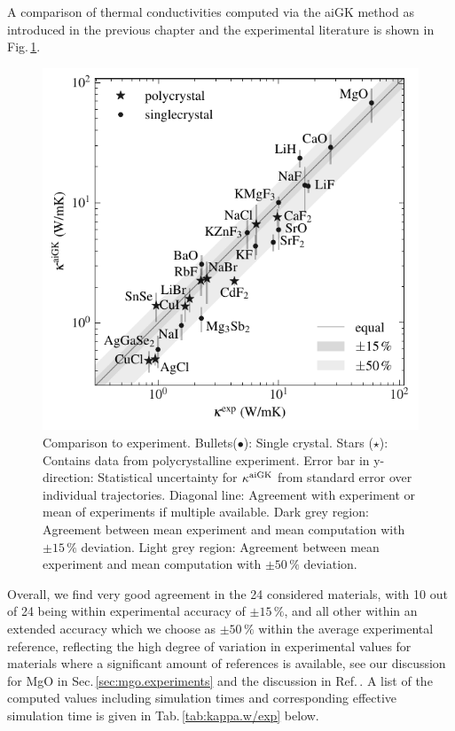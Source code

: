 A comparison of thermal conductivities computed via the aiGK method as introduced in the previous chapter and the experimental literature is shown in Fig.\,\ref{fig:kappa_exp}.
%
\begin{figure}
	\includegraphics[width=\textwidth]{./data/plots/kappa_vs_exp_trusted/kappa_vs_exp_corrected_annotated.pdf}
	\caption{Comparison to experiment. Bullets($\bullet$): Single crystal. Stars ($\star$): Contains data from polycrystalline experiment. Error bar in y-direction: Statistical uncertainty for $\kappa^{\rm aiGK}$ from standard error over individual trajectories. Diagonal line: Agreement with experiment or mean of experiments if multiple available. Dark grey region: Agreement between mean experiment and mean computation with $\pm 15\,\%$ deviation. Light grey region: Agreement between mean experiment and mean computation with $\pm 50\,\%$ deviation.}
	\label{fig:kappa_exp}
\end{figure}
%
Overall, we find very good agreement in the 24 considered materials, with 10 out of 24 being within experimental accuracy of $\pm 15\,\%$, and all other within an extended %
accuracy which we choose as $\pm 50\,\%$ within the average experimental reference, reflecting the high degree of variation in experimental values for materials where a significant amount of references is available, see our discussion for MgO in Sec.\,\ref{sec:mgo.experiments} and the discussion in Ref.\,\cite{Wei.2016}. A list of the computed values including simulation times and corresponding effective simulation time is given in Tab.\,\ref{tab:kappa.w/exp} below.

